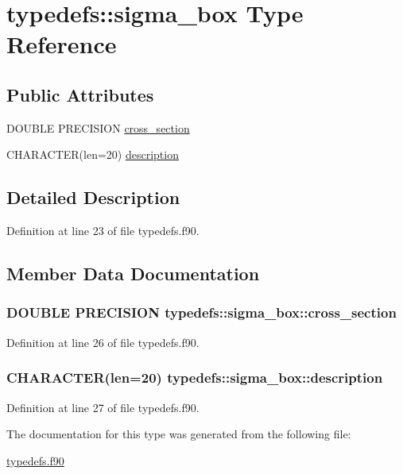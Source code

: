 \hypertarget{typetypedefs_1_1sigma__box}{
\section{typedefs::sigma\_\-box Type Reference}
\label{typetypedefs_1_1sigma__box}
}
\subsection*{Public Attributes}
\begin{DoxyCompactItemize}
\item 
DOUBLE PRECISION \hyperlink{typetypedefs_1_1sigma__box_acd47dc6d59cb59c36a915975c1c1a68b}{cross\_\-section}
\item 
CHARACTER(len=20) \hyperlink{typetypedefs_1_1sigma__box_a712c78da86a6cdbeaa19935b678a1732}{description}
\end{DoxyCompactItemize}


\subsection{Detailed Description}


Definition at line 23 of file typedefs.f90.

\subsection{Member Data Documentation}
\hypertarget{typetypedefs_1_1sigma__box_acd47dc6d59cb59c36a915975c1c1a68b}{
\subsubsection[{cross\_\-section}]{\setlength{\rightskip}{0pt plus 5cm}DOUBLE PRECISION {\bf typedefs::sigma\_\-box::cross\_\-section}}}
\label{typetypedefs_1_1sigma__box_acd47dc6d59cb59c36a915975c1c1a68b}


Definition at line 26 of file typedefs.f90.\hypertarget{typetypedefs_1_1sigma__box_a712c78da86a6cdbeaa19935b678a1732}{
\subsubsection[{description}]{\setlength{\rightskip}{0pt plus 5cm}CHARACTER(len=20) {\bf typedefs::sigma\_\-box::description}}}
\label{typetypedefs_1_1sigma__box_a712c78da86a6cdbeaa19935b678a1732}


Definition at line 27 of file typedefs.f90.

The documentation for this type was generated from the following file:\begin{DoxyCompactItemize}
\item 
\hyperlink{typedefs_8f90}{typedefs.f90}\end{DoxyCompactItemize}
